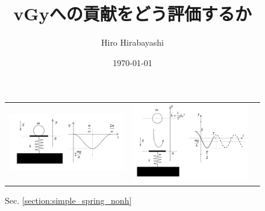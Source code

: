 \documentclass[a4paper,11pt]{jsarticle}
\begin{document}
\title{vGyへの貢献をどう評価するか}
\author{Hiro Hirabayashi}
\date{\today}
\maketitle

\begin{figure}[h]
  \centering
  \begin{tabular}{ccc}
    \begin{minipage}[t]{0.33\textwidth}
      \begin{subcaptionblock}{1\textwidth}
        \centering
        \includegraphics[width=1\textwidth]{simple_string.png}
        \caption{Sec. \ref{section:simple_spring_nonh}}
        \label{simple_string.png}
      \end{subcaptionblock}
    \end{minipage} &
    \begin{minipage}[t]{0.33\textwidth}
      \begin{subcaptionblock}{1\textwidth}
        \centering
        \includegraphics[width=1\textwidth]{fall_and_spring.png}

\end{subcaptionblock}
\end{minipage}
\end{tabular}
\end{figure}
\end{document}
